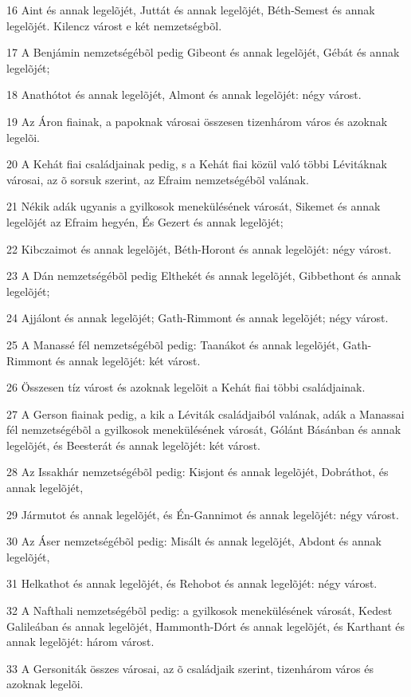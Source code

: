 \par 16 Aint és annak legelõjét, Juttát és annak legelõjét, Béth-Semest és annak legelõjét. Kilencz várost e két nemzetségbõl.
\par 17 A Benjámin nemzetségébõl pedig Gibeont és annak legelõjét, Gébát és annak legelõjét;
\par 18 Anathótot és annak legelõjét, Almont és annak legelõjét: négy várost.
\par 19 Az Áron fiainak, a papoknak városai összesen tizenhárom város és azoknak legelõi.
\par 20 A Kehát fiai családjainak pedig, s a Kehát fiai közül való többi Lévitáknak városai, az õ sorsuk szerint, az Efraim nemzetségébõl valának.
\par 21 Nékik adák ugyanis a gyilkosok menekülésének városát, Sikemet és annak legelõjét az Efraim hegyén, És Gezert és annak legelõjét;
\par 22 Kibczaimot és annak legelõjét, Béth-Horont és annak legelõjét: négy várost.
\par 23 A Dán nemzetségébõl pedig Elthekét és annak legelõjét, Gibbethont és annak legelõjét;
\par 24 Ajjálont és annak legelõjét; Gath-Rimmont és annak legelõjét; négy várost.
\par 25 A Manassé fél nemzetségébõl pedig: Taanákot és annak legelõjét, Gath-Rimmont és annak legelõjét: két várost.
\par 26 Összesen tíz várost és azoknak legelõit a Kehát fiai többi családjainak.
\par 27 A Gerson fiainak pedig, a kik a Léviták családjaiból valának, adák a Manassai fél nemzetségébõl a gyilkosok menekülésének városát,  Gólánt Básánban és annak legelõjét, és Beesterát és annak legelõjét: két várost.
\par 28 Az Issakhár nemzetségébõl pedig: Kisjont és annak legelõjét, Dobráthot, és annak legelõjét,
\par 29 Jármutot és annak legelõjét, és Én-Gannimot és annak legelõjét: négy várost.
\par 30 Az Áser nemzetségébõl pedig: Misált és annak legelõjét, Abdont és annak legelõjét,
\par 31 Helkathot és annak legelõjét, és Rehobot és annak legelõjét: négy várost.
\par 32 A Nafthali nemzetségébõl pedig: a gyilkosok menekülésének városát, Kedest Galileában és annak legelõjét, Hammonth-Dórt és annak legelõjét, és Karthant és annak legelõjét: három várost.
\par 33 A Gersoniták összes városai, az õ családjaik szerint, tizenhárom város és azoknak legelõi.
